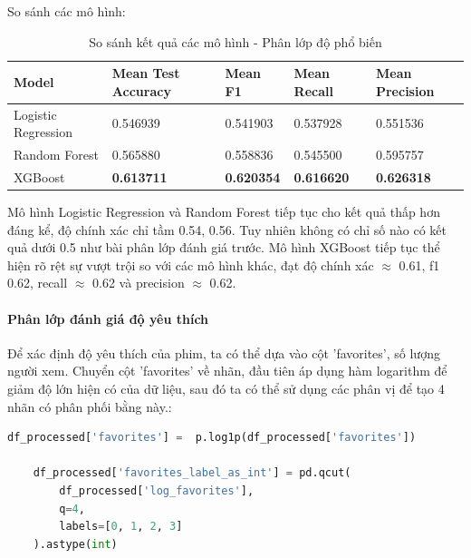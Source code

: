     So sánh các mô hình:

    \begin{table}[htbp]
        \centering
        \caption{So sánh kết quả các mô hình - Phân lớp độ phổ biến}
        \label{tab:mal-member-compare}
        \begin{tabular}{|p{4cm}|p{2cm}|p{2cm}|p{2cm}|p{2cm}|}
            \hline
             Model & Mean Test Accuracy & Mean F1 & Mean Recall & Mean Precision\\
            \hline
            Logistic Regression & 0.546939 & 0.541903 & 0.537928 & 0.551536 \\
            \hline
            Random Forest & 0.565880 & 0.558836 & 0.545500 & 0.595757 \\
            \hline
            XGBoost & \textbf{0.613711} & \textbf{0.620354} & \textbf{0.616620} & \textbf{0.626318} \\
            \hline
        \end{tabular}
    \end{table}

    \FloatBarrier

    Mô hình Logistic Regression và Random Forest tiếp tục cho kết quả thấp hơn đáng kể, độ chính xác chỉ tầm 0.54, 0.56. Tuy nhiên không có chỉ số nào có kết quả dưới 0.5 như bài phân lớp đánh giá trước. Mô hình XGBoost tiếp tục thể hiện rõ rệt sự vượt trội so với các mô hình khác, đạt độ chính xác $\approx$ 0.61, f1 0.62, recall $\approx$ 0.62 và precision $\approx$ 0.62. 

    \paragraph{Phân lớp đánh giá độ yêu thích}
    \leavevmode

    Để xác định độ yêu thích của phim, ta có thể dựa vào cột 'favorites', số lượng người xem. Chuyển cột 'favorites' về nhãn, đầu tiên áp dụng hàm logarithm để giảm độ lớn hiện có của dữ liệu, sau đó ta có thể sử dụng các phân vị để tạo 4 nhãn có phân phối bằng này.:

    \begin{lstlisting}[language=Python]
    df_processed['favorites'] =  p.log1p(df_processed['favorites'])
    
    df_processed['favorites_label_as_int'] = pd.qcut(
        df_processed['log_favorites'],
        q=4,
        labels=[0, 1, 2, 3]
    ).astype(int)
    \end{lstlisting}


